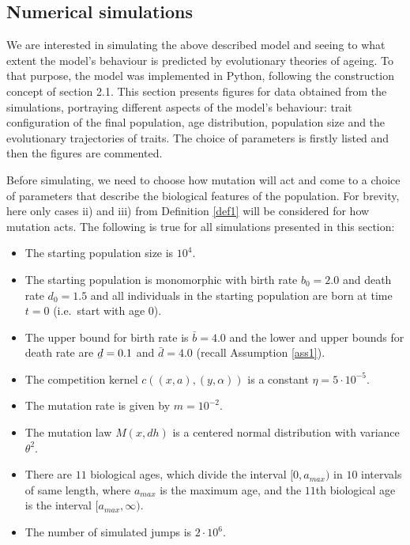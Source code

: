 \documentclass[11pt, a4paper]{article}
\newcommand{\ubar}[1]{\underaccent{\bar}{#1}}
\theoremstyle{definition}
\begin{document}

\subsection{Numerical simulations}
    We are interested in simulating the above described model and seeing to what extent the model's behaviour is predicted by evolutionary theories of ageing. To that purpose, the model was implemented in Python, following the construction concept of section 2.1. This section presents figures for data obtained from the simulations, portraying different aspects of the model's behaviour: trait configuration of the final population, age distribution, population size and the evolutionary trajectories
    of traits. The choice of parameters is firstly listed and then the figures are commented.
    
    Before simulating, we need to choose how mutation will act and come to a choice of parameters that describe the biological features of the population. For brevity, here only cases ii) and iii) from Definition \ref{def1} will be considered for how mutation acts. The following is true for all simulations presented in this section:
    \begin{itemize}
        \item The starting population size is $10^4$.
        \item The starting population is monomorphic with birth rate $b_0 = 2.0$ and death rate $d_0 = 1.5$ and all individuals in the starting population are born at time $t=0$ (i.e.\ start with age $0$).
        \item The upper bound for birth rate is $\bar{b} = 4.0$ and the lower and upper bounds for death rate are $\ubar{d} = 0.1$ and $\bar{d} = 4.0$ (recall Assumption \ref{ass1}).
        \item The competition kernel $c((x,a),(y,\alpha))$ is a constant $\eta = 5\cdot 10^{-5}$.
        \item The mutation rate is given by $m = 10^{-2}$.
        \item The mutation law $M(x,dh)$ is a centered normal distribution with variance $\theta^2$.
        \item There are $11$ biological ages, which divide the interval $[0, a_{max})$ in $10$ intervals of same length, where $a_{max}$ is the maximum age, and the $11$th biological age is the interval $[a_{max}, \infty)$.
        \item The number of simulated jumps is $2\cdot 10^6$.
    \end{itemize}
\end{document}
